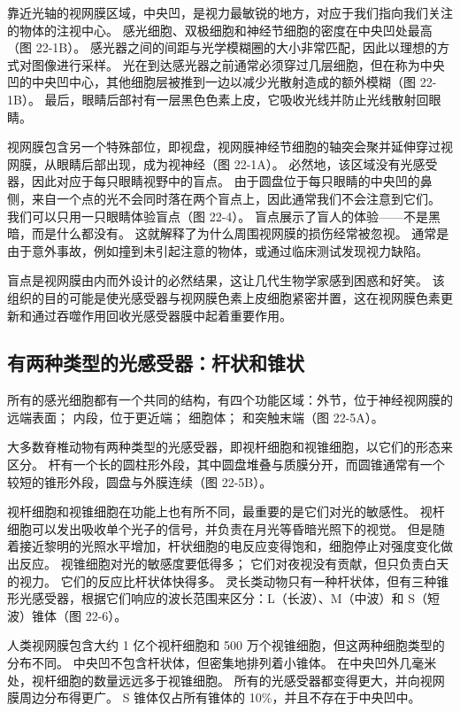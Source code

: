 靠近光轴的视网膜区域，中央凹，是视力最敏锐的地方，对应于我们指向我们关注的物体的注视中心。 感光细胞、双极细胞和神经节细胞的密度在中央凹处最高（图 22-1B）。 感光器之间的间距与光学模糊圈的大小非常匹配，因此以理想的方式对图像进行采样。 光在到达感光器之前通常必须穿过几层细胞，但在称为中央凹的中央凹中心，其他细胞层被推到一边以减少光散射造成的额外模糊（图 22-1B）。 最后，眼睛后部衬有一层黑色色素上皮，它吸收光线并防止光线散射回眼睛。

视网膜包含另一个特殊部位，即视盘，视网膜神经节细胞的轴突会聚并延伸穿过视网膜，从眼睛后部出现，成为视神经（图 22-1A）。 必然地，该区域没有光感受器，因此对应于每只眼睛视野中的盲点。 由于圆盘位于每只眼睛的中央凹的鼻侧，来自一个点的光不会同时落在两个盲点上，因此通常我们不会注意到它们。 我们可以只用一只眼睛体验盲点（图 22-4）。 盲点展示了盲人的体验——不是黑暗，而是什么都没有。 这就解释了为什么周围视网膜的损伤经常被忽视。 通常是由于意外事故，例如撞到未引起注意的物体，或通过临床测试发现视力缺陷。

盲点是视网膜由内而外设计的必然结果，这让几代生物学家感到困惑和好笑。 该组织的目的可能是使光感受器与视网膜色素上皮细胞紧密并置，这在视网膜色素更新和通过吞噬作用回收光感受器膜中起着重要作用。

\subsection{有两种类型的光感受器：杆状和锥状}

所有的感光细胞都有一个共同的结构，有四个功能区域：外节，位于神经视网膜的远端表面； 内段，位于更近端； 细胞体； 和突触末端（图 22-5A）。

大多数脊椎动物有两种类型的光感受器，即视杆细胞和视锥细胞，以它们的形态来区分。 杆有一个长的圆柱形外段，其中圆盘堆叠与质膜分开，而圆锥通常有一个较短的锥形外段，圆盘与外膜连续（图 22-5B）。

视杆细胞和视锥细胞在功能上也有所不同，最重要的是它们对光的敏感性。 视杆细胞可以发出吸收单个光子的信号，并负责在月光等昏暗光照下的视觉。 但是随着接近黎明的光照水平增加，杆状细胞的电反应变得饱和，细胞停止对强度变化做出反应。 视锥细胞对光的敏感度要低得多； 它们对夜视没有贡献，但只负责白天的视力。 它们的反应比杆状体快得多。 灵长类动物只有一种杆状体，但有三种锥形光感受器，根据它们响应的波长范围来区分：L（长波）、M（中波）和 S（短波）锥体（图 22-6）。

人类视网膜包含大约 1 亿个视杆细胞和 500 万个视锥细胞，但这两种细胞类型的分布不同。 中央凹不包含杆状体，但密集地排列着小锥体。 在中央凹外几毫米处，视杆细胞的数量远远多于视锥细胞。 所有的光感受器都变得更大，并向视网膜周边分布得更广。 S 锥体仅占所有锥体的 10\%，并且不存在于中央凹中。

